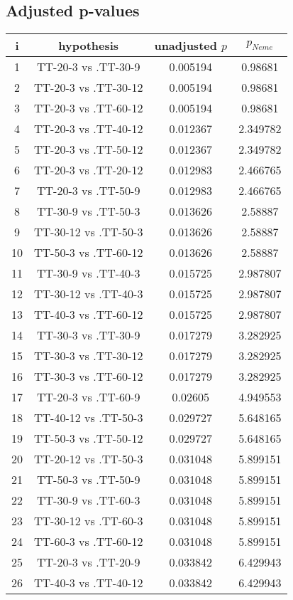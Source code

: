 \documentclass[a4paper,10pt]{article}
\begin{document}
\begin{landscape}
\pagebreak

\subsection{Adjusted p-values}

\begin{table}[!htp]
\centering\scriptsize
\begin{tabular}{cccc}
i&hypothesis&unadjusted $p$&$p_{Neme}$\\
\hline1&TT-20-3 vs .TT-30-9&0.005194&0.98681\\
2&TT-20-3 vs .TT-30-12&0.005194&0.98681\\
3&TT-20-3 vs .TT-60-12&0.005194&0.98681\\
4&TT-20-3 vs .TT-40-12&0.012367&2.349782\\
5&TT-20-3 vs .TT-50-12&0.012367&2.349782\\
6&TT-20-3 vs .TT-20-12&0.012983&2.466765\\
7&TT-20-3 vs .TT-50-9&0.012983&2.466765\\
8&TT-30-9 vs .TT-50-3&0.013626&2.58887\\
9&TT-30-12 vs .TT-50-3&0.013626&2.58887\\
10&TT-50-3 vs .TT-60-12&0.013626&2.58887\\
11&TT-30-9 vs .TT-40-3&0.015725&2.987807\\
12&TT-30-12 vs .TT-40-3&0.015725&2.987807\\
13&TT-40-3 vs .TT-60-12&0.015725&2.987807\\
14&TT-30-3 vs .TT-30-9&0.017279&3.282925\\
15&TT-30-3 vs .TT-30-12&0.017279&3.282925\\
16&TT-30-3 vs .TT-60-12&0.017279&3.282925\\
17&TT-20-3 vs .TT-60-9&0.02605&4.949553\\
18&TT-40-12 vs .TT-50-3&0.029727&5.648165\\
19&TT-50-3 vs .TT-50-12&0.029727&5.648165\\
20&TT-20-12 vs .TT-50-3&0.031048&5.899151\\
21&TT-50-3 vs .TT-50-9&0.031048&5.899151\\
22&TT-30-9 vs .TT-60-3&0.031048&5.899151\\
23&TT-30-12 vs .TT-60-3&0.031048&5.899151\\
24&TT-60-3 vs .TT-60-12&0.031048&5.899151\\
25&TT-20-3 vs .TT-20-9&0.033842&6.429943\\
26&TT-40-3 vs .TT-40-12&0.033842&6.429943\\

\end{tabular}
\end{table}
\end{landscape}
\end{document}
